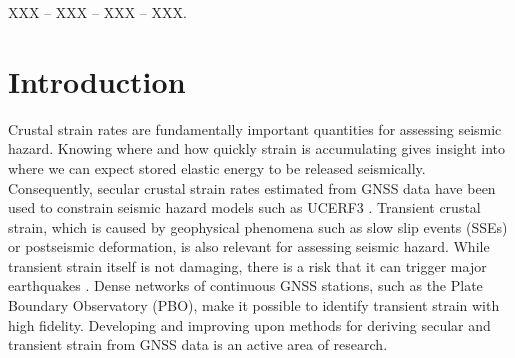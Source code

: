 \documentclass[extra,mreferee]{gji}
\begin{document}
\begin{keywords}
 XXX -- XXX -- XXX -- XXX.
\end{keywords}

\section{Introduction}\label{sec:Introduction}


Crustal strain rates are fundamentally important quantities for
assessing seismic hazard. Knowing where and how quickly strain is
accumulating gives insight into where we can expect stored elastic
energy to be released seismically. Consequently, secular crustal
strain rates estimated from GNSS data have been used to constrain
seismic hazard models such as UCERF3 \citep{Field2014}. Transient
crustal strain, which is caused by geophysical phenomena such as slow
slip events (SSEs) or postseismic deformation, is also relevant for
assessing seismic hazard. While transient strain itself is not
damaging, there is a risk that it can trigger major earthquakes
\citep{Roeloffs2006,Freed2001}. Dense networks of continuous GNSS
stations, such as the Plate Boundary Observatory (PBO), make it
possible to identify transient strain with high fidelity. Developing
and improving upon methods for deriving secular and transient strain
from GNSS data is an active area of research.

\end{document}
